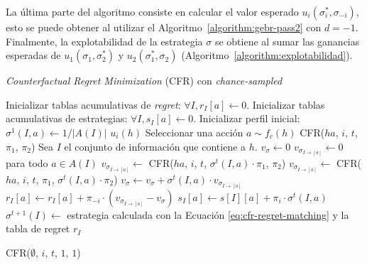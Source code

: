La última parte del algoritmo consiste en calcular el valor esperado $u_i(\sigma^*_i, \sigma_{-i})$, esto se puede obtener al utilizar el Algoritmo~\ref{algorithm:gebr-pass2} con $d = -1$. Finalmente, la explotabilidad de la estrategia $\sigma$ se obtiene al sumar las ganancias esperadas de $u_1(\sigma_1, \sigma^*_2)$ y $u_2(\sigma^*_1, \sigma_2)$ (Algoritmo~\ref{algorithm:explotabilidad}).

\begin{algorithm}[H]
\caption{\textit{Counterfactual Regret Minimization} (CFR) con \textit{chance-sampled}}
\label{algorithm:CFR}
\begin{algorithmic}[1]
    \State Inicializar tablas acumulativas de \textit{regret}: $\forall I, r_I[a] \leftarrow 0$.
    \State Inicializar tablas acumulativas de estrategias: $\forall I, s_I[a] \leftarrow 0$.
    \State Inicializar perfil inicial: $\sigma^1(I, a) \leftarrow 1/|A(I)|$ \label{x}
    \State
            \State \Return $u_i(h)$
            \State Seleccionar una acción $a \sim f_c(h)$
            \State \Return CFR($ha$, $i$, $t$, $\pi_1$, $\pi_2$)
        \EndIf
        \State Sea $I$ el conjunto de información que contiene a $h$.
        \State $v_{\sigma} \leftarrow 0$
        \State $v_{\sigma_{I \rightarrow [a]}} \leftarrow 0 $ para todo $a \in A(I)$
                \State $v_{\sigma_{I \rightarrow [a]}} \leftarrow$ CFR($ha$, $i$, $t$, $\sigma^t(I, a) \cdot \pi_1$, $\pi_2$)
                \State $v_{\sigma_{I \rightarrow [a]}} \leftarrow$ CFR($ha$, $i$, $t$, $\pi_1$, $\sigma^t(I, a) \cdot \pi_2$)
            \EndIf
            \State $v_{\sigma} \leftarrow v_{\sigma} + \sigma^t(I, a) \cdot v_{\sigma_{I \rightarrow [a]}}$
        \EndFor
                \State $r_I[a] \leftarrow r_I[a] + \pi_{-i} \cdot (v_{\sigma_{I \rightarrow [a]}} - v_{\sigma})$
                \State $s_{I}[a] \leftarrow s[I][a] + \pi_i \cdot \sigma^t(I, a)$
            \EndFor
            \State $\sigma^{t+1}(I) \leftarrow $ estrategia calculada con la Ecuación \ref{eq:cfr-regret-matching} y la tabla de regret $r_I$  
        \EndIf
    \EndFunction
    \State

                \State CFR($\emptyset$, $i$, $t$, $1$, $1$)
            \EndFor
        \EndFor
    \EndFunction
\end{algorithmic}
\end{algorithm}

